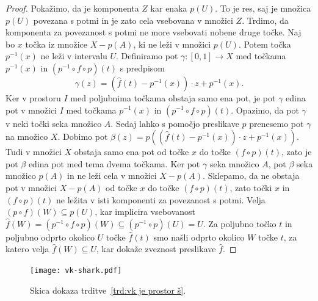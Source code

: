\documentclass[../TG_magistrsko_delo_sections.tex]{subfiles}
\begin{document}
\begin{proof}
Pokažimo, da je komponenta $Z$ kar enaka $p(U)$. To je res, saj je množica $p(U)$ povezana s potmi in je zato cela vsebovana v množici $Z$. Trdimo, da komponenta za povezanost s potmi ne more vsebovati nobene druge točke. Naj bo $x$ točka iz množice $X - p(A)$, ki ne leži v množici $p(U)$. Potem točka $p^{-1}(x)$ ne leži v intervalu $U$. Definiramo pot $\gamma : [0, 1] \to X$ med točkama $p^{-1}(x)$ in $(p^{-1} \circ f  \circ p)(t)$ s predpisom 
$$\gamma(z) = (\widehat{f}(t) - p^{-1}(x)) \cdot z + p^{-1}(x).$$ 
Ker v prostoru $I$ med poljubnima točkama obstaja samo ena pot, je pot $\gamma$ edina pot v množici $I$ med točkama $p^{-1}(x)$ in $(p^{-1} \circ f \circ p)(t)$. 
Opazimo, da pot $\gamma$ v neki točki seka množico $A$. Sedaj lahko s pomočjo preslikave $p$ prenesemo pot $\gamma$ na množico $X$. Dobimo pot $\beta(z) =p((\widehat{f}(t) - p^{-1}(x)) \cdot z + p^{-1}(x))$. Tudi v množici $X$ obstaja samo ena pot od točke $x$ do točke $(f \circ p)(t)$, zato je pot $\beta$ edina pot med tema dvema točkama. Ker pot $\gamma$ seka množico $A$, pot $\beta$ seka množico $p(A)$ in ne leži cela v množici $X - p(A)$. Sklepamo, da ne obstaja pot v množici $X - p(A)$ od točke $x$ do točke $(f \circ p)(t)$, zato točki $x$ in $(f \circ p)(t)$ ne ležita v isti komponenti za povezanost s potmi. Velja $(p \circ f)(W) \subseteq p(U)$, kar implicira vsebovanost $\widehat{f}(W) = (p^{-1} \circ f \circ p)(W) \subseteq (p^{-1} \circ p)(U) = U$. Za poljubno točko $t$ in poljubno odprto okolico $U$ točke $\widehat{f}(t)$ smo našli odprto okolico $W$ točke $t$, za katero velja $\widehat{f}(W) \subseteq U$, kar dokaže zveznost preslikave $\widehat{f}$. 
\end{proof}

\begin{figure}[h]
  \centering
  \texttt{[image: vk-shark.pdf]}
  \caption[Varšavska krožnica]{Skica dokaza trditve~\ref{trd:vk je prostor š}.}
  \label{fig:varšavski}
\end{figure}
\end{document}

